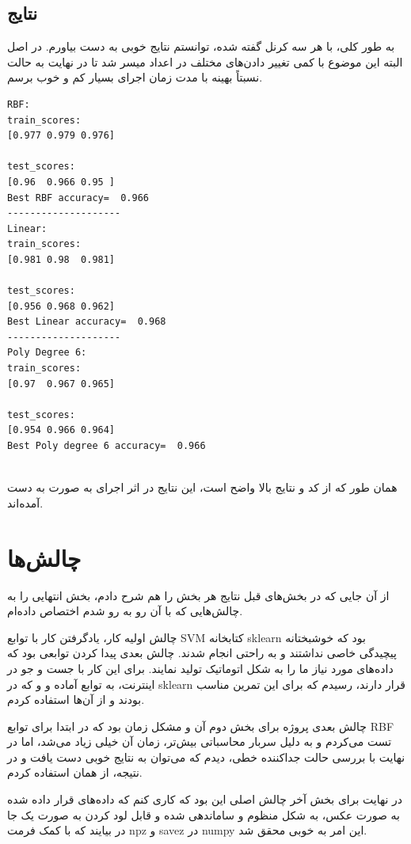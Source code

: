 \documentclass[12pt,titlepage,a4page , tikz , multi,table , svgnames,xcdraw]{article}
\begin{document}
\subsection{نتایج}

به طور کلی، با هر سه کرنل گفته شده، توانستم نتایج خوبی به دست بیاورم. در اصل البته این موضوع با کمی تغییر دادن‌های مختلف در اعداد میسر شد تا در نهایت به حالت نسبتاً بهینه با مدت زمان اجرای بسیار کم و خوب برسم.

\begin{latin}
\begin{verbatim}
RBF:
train_scores: 
[0.977 0.979 0.976]

test_scores: 
[0.96  0.966 0.95 ]
Best RBF accuracy=  0.966
--------------------
Linear:
train_scores: 
[0.981 0.98  0.981]

test_scores: 
[0.956 0.968 0.962]
Best Linear accuracy=  0.968
--------------------
Poly Degree 6:
train_scores: 
[0.97  0.967 0.965]

test_scores: 
[0.954 0.966 0.964]
Best Poly degree 6 accuracy=  0.966


\end{verbatim}
\end{latin}

همان طور که از کد و نتایج بالا واضح است،  این نتایج در اثر اجرای  به صورت  به دست آمده‌اند.


\newpage



\section{چالش‌ها}

از آن جایی که در بخش‌های قبل نتایج هر بخش را هم شرح دادم، بخش انتهایی را به چالش‌هایی که با آن رو به رو شدم اختصاص داده‌ام.


چالش اولیه کار، یادگرفتن کار با توابع SVM کتابخانه sklearn بود که خوشبختانه پیچیدگی خاصی نداشتند و به راحتی انجام شدند. چالش بعدی پیدا کردن توابعی بود که داده‌های مورد نیاز ما را به شکل اتوماتیک تولید نمایند. برای این کار با جست و جو در اینترنت، به توابع آماده  و  و  که در sklearn قرار دارند، رسیدم که برای این تمرین مناسب بودند و از آن‌ها استفاده کردم.

چالش بعدی پروژه برای بخش دوم آن و مشکل زمان بود که در ابتدا برای توابع RBF تست می‌کردم و به دلیل سربار محاسباتی بیش‌تر، زمان آن خیلی زیاد می‌شد، اما در نهایت با بررسی حالت  جداکننده خطی، دیدم که می‌توان به نتایج خوبی دست یافت و در نتیجه، از همان استفاده کردم.

در نهایت برای بخش آخر چالش اصلی این بود که کاری کنم که داده‌های قرار داده شده به صورت عکس، به شکل منظوم و ساماندهی شده و قابل لود کردن به صورت یک جا در بیایند که با کمک فرمت npz و savez در numpy این امر به خوبی محقق شد.
\end{document}

